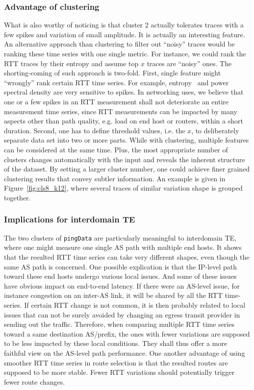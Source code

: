 \subsubsection{Advantage of clustering}
What is also worthy of noticing is that cluster 2 actually tolerates traces with a few spikes and variation of small amplitude. 
It is actually an interesting feature.
An alternative approach than clustering to filter out ``noisy'' traces would be ranking these time series with one single metric.
For instance, we could rank the RTT traces by their entropy and assume top $x$ traces are ``noisy'' ones. 
The shorting-coming of such approach is two-fold.
First, single feature might ``wrongly'' rank certain RTT time series. 
For example, entropy~\cite{Molina-Pico2011} and power spectral density are very sensitive to spikes. 
In networking uses, we believe that one or a few spikes in an RTT measurement shall not deteriorate an entire measurement time series, since RTT measurements can be impacted by many aspects other than path quality, e.g. load on end host or routers,  within a short duration.
Second, one has to define threshold values, i.e. the $x$, to deliberately separate data set into two or more parts. 
While with clustering, multiple features can be considered at the same time. 
Plus, the most appropriate number of clusters changes automatically with the input and reveals the inherent structure of the dataset. 
By setting a larger cluster number, one could achieve finer grained clustering results that convey subtler information. 
An example is given in Figure~\ref{fig:cls8_k12}, where several traces of similar variation shape is grouped together.

\subsubsection{Implications for interdomain TE}
The two clusters of \texttt{pingData} are particularly meaningful to interdomain TE, where one might measure one single AS path with multiple end hosts.
It shows that the resulted RTT time series can take very different shapes, even though the same AS path is concerned. 
One possible explication is that the IP-level path toward these end hosts undergo various local issues.
And some of these issues have obvious impact on end-to-end latency.
If there were an AS-level issue, for instance congestion on an inter-AS link, it will be shared by all the RTT time-series. 
If certain RTT change is not common, it is then probably related to local issues that can not be surely avoided by changing an egress transit provider in sending out the traffic.
Therefore, when comparing multiple RTT time series toward a same destination AS/prefix, the ones with fewer variations are supposed to be less impacted by these local conditions.
They shall thus offer a more faithful view on the AS-level path performance.
One another advantage of using smoother RTT time series in route selection is that the resulted routes are supposed to be more stable.
Fewer RTT variations should potentially trigger fewer route changes. 

